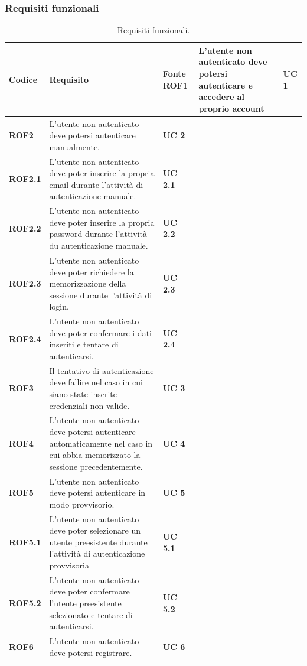 \subsubsection{Requisiti funzionali}
\begin{longtable}{ |p{2cm}|p{8cm}|p{2cm}|  }
    \caption{Requisiti funzionali.}
    \label{tab:req-funzionali}
    \hline
    \textbf{Codice} & \textbf{Requisito} & \textbf{Fonte}
    \hline
    \textbf{ROF1}   & L'utente non autenticato deve potersi autenticare e accedere al proprio account & \textbf{UC 1}   \\ \hline
    \textbf{ROF2}   & L'utente non autenticato deve potersi autenticare manualmente. & \textbf{UC 2}   \\ \hline
    \textbf{ROF2.1} & L'utente non autenticato deve poter inserire la propria email durante l'attività di autenticazione manuale. & \textbf{UC 2.1} \\ \hline
    \textbf{ROF2.2} & L'utente non autenticato deve poter inserire la propria password durante l'attività du autenticazione manuale. & \textbf{UC 2.2} \\ \hline
    \textbf{ROF2.3} & L'utente non autenticato deve poter richiedere la memorizzazione della sessione durante l'attività di login. & \textbf{UC 2.3} \\ \hline
    \textbf{ROF2.4} & L'utente non autenticato deve poter confermare i dati inseriti e tentare di autenticarsi. & \textbf{UC 2.4} \\ \hline
    \textbf{ROF3}   & Il tentativo di autenticazione deve fallire nel caso in cui siano state inserite credenziali non valide. & \textbf{UC 3}   \\ \hline
    \textbf{ROF4}   & L'utente non autenticato deve potersi autenticare automaticamente nel caso in cui abbia memorizzato la sessione precedentemente. & \textbf{UC 4}   \\ \hline
    \textbf{ROF5}   & L'utente non autenticato deve potersi autenticare in modo provvisorio. & \textbf{UC 5} \\ \hline
    \textbf{ROF5.1} & L'utente non autenticato deve poter selezionare un utente preesistente durante l'attività di autenticazione provvisoria & \textbf{UC 5.1} \\ \hline
    \textbf{ROF5.2} & L'utente non autenticato deve poter confermare l'utente preesistente selezionato e tentare di autenticarsi. & \textbf{UC 5.2} \\ \hline
    \textbf{ROF6}   & L'utente non autenticato deve potersi registrare. & \textbf{UC 6} \\ \hline

\end{longtable}
